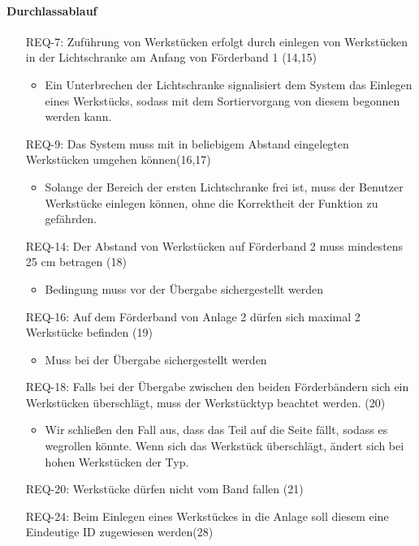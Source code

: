 \paragraph{Durchlassablauf}
\begin{itemize}
    \item[REQ-7:] Zuführung von Werkstücken erfolgt durch einlegen von Werkstücken in der Lichtschranke am Anfang von Förderband 1 (14,15)
    \begin{itemize}
        \item Ein Unterbrechen der Lichtschranke signalisiert dem System das Einlegen eines Werkstücks, sodass mit dem Sortiervorgang von diesem begonnen werden kann.
    \end{itemize}
    \item[REQ-9:] Das System muss mit in beliebigem Abstand eingelegten Werkstücken umgehen können(16,17)
    \begin{itemize}
        \item Solange der Bereich der ersten Lichtschranke frei ist, muss der Benutzer Werkstücke einlegen können, ohne die Korrektheit der Funktion zu gefährden.
    \end{itemize}
    \item[REQ-14:] Der Abstand von Werkstücken auf Förderband 2 muss mindestens 25 cm betragen (18)
    \begin{itemize}
        \item Bedingung muss vor der Übergabe sichergestellt werden
    \end{itemize}
    \item[REQ-16:] Auf dem Förderband von Anlage 2 dürfen sich maximal 2 Werkstücke befinden (19)
    \begin{itemize}
        \item Muss bei der Übergabe sichergestellt werden
    \end{itemize}
    \item[REQ-18:] Falls bei der Übergabe zwischen den beiden Förderbändern sich ein Werkstücken überschlägt, muss der Werkstücktyp beachtet werden. (20)
    \begin{itemize}
        \item Wir schließen den Fall aus, dass das Teil auf die Seite fällt, sodass es wegrollen könnte. Wenn sich das Werkstück überschlägt, ändert sich bei hohen Werkstücken der Typ.
    \end{itemize}
    \item[REQ-20:] Werkstücke dürfen nicht vom Band fallen (21)
    \item[REQ-24:] Beim Einlegen eines Werkstückes in die Anlage soll diesem eine Eindeutige ID zugewiesen werden(28)

\end{itemize}
